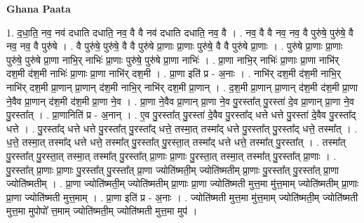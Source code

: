 \documentclass[17pt]{extarticle}
\begin{document}
\textbf{Ghana Paata } \newline

1. द॒धा॒ति॒ नव॒ नव॑ दधाति दधाति॒ नव॒ वै वै नव॑ दधाति दधाति॒ नव॒ वै । . नव॒ वै वै नव॒ नव॒ वै पुरु॑षे॒ पुरु॑षे॒ वै नव॒ नव॒ वै पुरु॑षे । . वै पुरु॑षे॒ पुरु॑षे॒ वै वै पुरु॑षे प्रा॒णाः प्रा॒णाः पुरु॑षे॒ वै वै पुरु॑षे प्रा॒णाः । . पुरु॑षे प्रा॒णाः प्रा॒णाः पुरु॑षे॒ पुरु॑षे प्रा॒णा नाभि॒र् नाभिः॑ प्रा॒णाः पुरु॑षे॒ पुरु॑षे प्रा॒णा नाभिः॑ । . प्रा॒णा नाभि॒र् नाभिः॑ प्रा॒णाः प्रा॒णा नाभि॑र् दश॒मी द॑श॒मी नाभिः॑ प्रा॒णाः प्रा॒णा नाभि॑र् दश॒मी । . प्रा॒णा इति॑ प्र - अ॒नाः । . नाभि॑र् दश॒मी द॑श॒मी नाभि॒र् नाभि॑र् दश॒मी प्रा॒णान् प्रा॒णान् द॑श॒मी नाभि॒र् नाभि॑र् दश॒मी प्रा॒णान् । . द॒श॒मी प्रा॒णान् प्रा॒णान् द॑श॒मी द॑श॒मी प्रा॒णा ने॒वैव प्रा॒णान् द॑श॒मी द॑श॒मी प्रा॒णा ने॒व । . प्रा॒णा ने॒वैव प्रा॒णान् प्रा॒णा ने॒व पु॒रस्ता᳚त् पु॒रस्ता॑ दे॒व प्रा॒णान् प्रा॒णा ने॒व पु॒रस्ता᳚त् । . प्रा॒णानिति॑ प्र - अ॒नान् । . ए॒व पु॒रस्ता᳚त् पु॒रस्ता॑ दे॒वैव पु॒रस्ता᳚द् धत्ते धत्ते पु॒रस्ता॑ दे॒वैव पु॒रस्ता᳚द् धत्ते । . पु॒रस्ता᳚द् धत्ते धत्ते पु॒रस्ता᳚त् पु॒रस्ता᳚द् धत्ते॒ तस्मा॒त् तस्मा᳚द् धत्ते पु॒रस्ता᳚त् पु॒रस्ता᳚द् धत्ते॒ तस्मा᳚त् । . ध॒त्ते॒ तस्मा॒त् तस्मा᳚द् धत्ते धत्ते॒ तस्मा᳚त् पु॒रस्ता᳚त् पु॒रस्ता॒त् तस्मा᳚द् धत्ते धत्ते॒ तस्मा᳚त् पु॒रस्ता᳚त् । . तस्मा᳚त् पु॒रस्ता᳚त् पु॒रस्ता॒त् तस्मा॒त् तस्मा᳚त् पु॒रस्ता᳚त् प्रा॒णाः प्रा॒णाः पु॒रस्ता॒त् तस्मा॒त् तस्मा᳚त् पु॒रस्ता᳚त् प्रा॒णाः । . पु॒रस्ता᳚त् प्रा॒णाः प्रा॒णाः पु॒रस्ता᳚त् पु॒रस्ता᳚त् प्रा॒णा ज्योति॑ष्मती॒म् ज्योति॑ष्मतीम् प्रा॒णाः पु॒रस्ता᳚त् पु॒रस्ता᳚त् प्रा॒णा ज्योति॑ष्मतीम् । . प्रा॒णा ज्योति॑ष्मती॒म् ज्योति॑ष्मतीम् प्रा॒णाः प्रा॒णा ज्योति॑ष्मती मुत्त॒मा मु॑त्त॒माम् ज्योति॑ष्मतीम् प्रा॒णाः प्रा॒णा ज्योति॑ष्मती मुत्त॒माम् । . प्रा॒णा इति॑ प्र - अ॒नाः । . ज्योति॑ष्मती मुत्त॒मा मु॑त्त॒माम् ज्योति॑ष्मती॒म् ज्योति॑ष्मती मुत्त॒मा मुपोपो᳚ त्त॒माम् ज्योति॑ष्मती॒म् ज्योति॑ष्मती मुत्त॒मा मुप॑ । \newline
\end{document}

